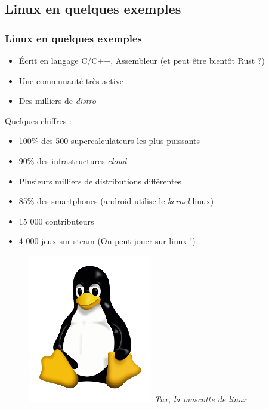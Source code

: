 \documentclass{beamer}
\begin{document}
        \subsection{Linux en quelques exemples}
        \begin{frame}
            \frametitle{Linux en quelques exemples}
            \begin{itemize}
                \item \'Ecrit en langage C/C++, Assembleur (et peut être bientôt Rust ?)
                \item Une communauté très active
                \item Des milliers de \emph{distro}
            \end{itemize}
            Quelques chiffres :
            \begin{itemize}
                \item 100\% des 500 supercalculateurs les plus puissants
                \item 90\% des infrastructures \emph{cloud}
                \item Plusieurs milliers de distributions différentes
                \item 85\% des smartphones (android utilise le \emph{kernel} linux)
                \item 15 000 contributeurs
                \item 4 000 jeux sur steam (On peut jouer sur linux !)
            \end{itemize}
            \begin{figure}
                \hspace*{5cm}
                \includegraphics[scale=0.4]{./src/tux.png}
                \hspace*{5cm}
                \textit{Tux, la mascotte de linux}
            \end{figure}
        \end{frame}
\end{document}
